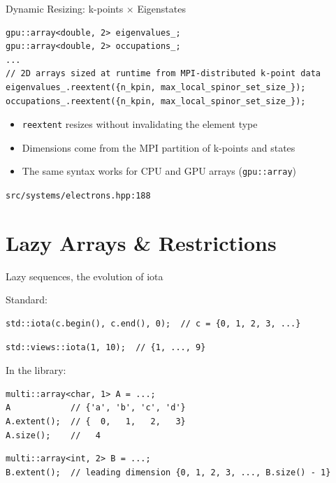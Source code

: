 \documentclass[t,aspectratio=169,handout]{beamer}
\begin{document}
\begin{frame}[fragile,label=inq4]{Dynamic Resizing: k-points $\times$ Eigenstates}
\begin{lstlisting}
gpu::array<double, 2> eigenvalues_;
gpu::array<double, 2> occupations_;
...
// 2D arrays sized at runtime from MPI-distributed k-point data
eigenvalues_.reextent({n_kpin, max_local_spinor_set_size_});
occupations_.reextent({n_kpin, max_local_spinor_set_size_});
\end{lstlisting}
\vspace{0.5em}
\begin{itemize}
  \item \texttt{reextent} resizes without invalidating the element type
  \item Dimensions come from the MPI partition of k-points and states
  \item The same syntax works for CPU and GPU arrays (\texttt{gpu::array})
\end{itemize}

\vspace{0.3em}
\tiny\texttt{src/systems/electrons.hpp:188}
\end{frame}

\section{Lazy Arrays \& Restrictions}

\begin{frame}[fragile]{Lazy sequences, the evolution of iota}

Standard:
  \begin{lstlisting}
std::iota(c.begin(), c.end(), 0);  // c = {0, 1, 2, 3, ...}
  \end{lstlisting}
  \begin{lstlisting}
std::views::iota(1, 10);  // {1, ..., 9}
  \end{lstlisting}

In the library:
  \begin{lstlisting}
multi::array<char, 1> A = ...;
A            // {'a', 'b', 'c', 'd'}
A.extent();  // {  0,   1,   2,   3}
A.size();    //   4
  \end{lstlisting}
  \begin{lstlisting}
multi::array<int, 2> B = ...;
B.extent();  // leading dimension {0, 1, 2, 3, ..., B.size() - 1}
  \end{lstlisting}

\end{frame}
\end{document}
